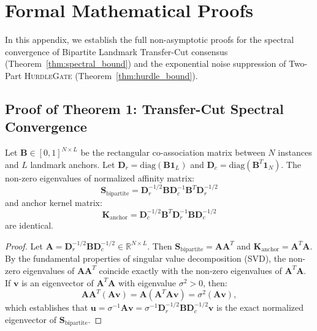 \appendix

\section{Formal Mathematical Proofs}\label{sec:appendix_proofs}

In this appendix, we establish the full non-asymptotic proofs for the spectral convergence of Bipartite Landmark Transfer-Cut consensus (Theorem~\ref{thm:spectral_bound}) and the exponential noise suppression of Two-Part \textsc{HurdleGate} (Theorem~\ref{thm:hurdle_bound}).

\subsection{Proof of Theorem 1: Transfer-Cut Spectral Convergence}

\begin{lemma}\label{lem:bipartite_svd}
Let $\mathbf{B} \in [0, 1]^{N \times L}$ be the rectangular co-association matrix between $N$ instances and $L$ landmark anchors. Let $\mathbf{D}_r = \mathrm{diag}(\mathbf{B} \mathbf{1}_L)$ and $\mathbf{D}_c = \mathrm{diag}(\mathbf{B}^T \mathbf{1}_N)$. The non-zero eigenvalues of normalized affinity matrix:
\begin{equation}
    \mathbf{S}_{\mathrm{bipartite}} = \mathbf{D}_r^{-1/2} \mathbf{B} \mathbf{D}_c^{-1} \mathbf{B}^T \mathbf{D}_r^{-1/2}
\end{equation}
and anchor kernel matrix:
\begin{equation}
    \mathbf{K}_{\mathrm{anchor}} = \mathbf{D}_c^{-1/2} \mathbf{B}^T \mathbf{D}_r^{-1} \mathbf{B} \mathbf{D}_c^{-1/2}
\end{equation}
are identical.
\end{lemma}

\begin{proof}
Let $\mathbf{A} = \mathbf{D}_r^{-1/2} \mathbf{B} \mathbf{D}_c^{-1/2} \in \mathbb{R}^{N \times L}$. Then $\mathbf{S}_{\mathrm{bipartite}} = \mathbf{A} \mathbf{A}^T$ and $\mathbf{K}_{\mathrm{anchor}} = \mathbf{A}^T \mathbf{A}$. By the fundamental properties of singular value decomposition (SVD), the non-zero eigenvalues of $\mathbf{A} \mathbf{A}^T$ coincide exactly with the non-zero eigenvalues of $\mathbf{A}^T \mathbf{A}$. If $\mathbf{v}$ is an eigenvector of $\mathbf{A}^T \mathbf{A}$ with eigenvalue $\sigma^2 > 0$, then:
\begin{equation}
    \mathbf{A} \mathbf{A}^T (\mathbf{A} \mathbf{v}) = \mathbf{A} (\mathbf{A}^T \mathbf{A} \mathbf{v}) = \sigma^2 (\mathbf{A} \mathbf{v}),
\end{equation}
which establishes that $\mathbf{u} = \sigma^{-1} \mathbf{A} \mathbf{v} = \sigma^{-1} \mathbf{D}_r^{-1/2} \mathbf{B} \mathbf{D}_c^{-1/2} \mathbf{v}$ is the exact normalized eigenvector of $\mathbf{S}_{\mathrm{bipartite}}$.
\end{proof}

